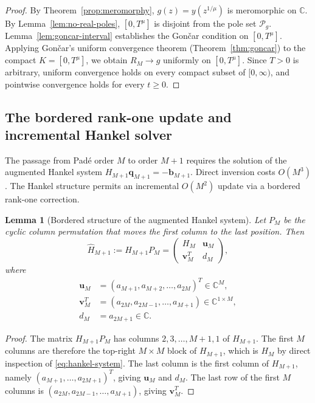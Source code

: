 \documentclass[11pt]{article}
\newtheorem{lemma}[theorem]{Lemma}
\theoremstyle{definition}
\theoremstyle{remark}
\begin{document}
\begin{proof}
By Theorem~\ref{prop:meromorphy}, $g(z)=y(z^{1/\mu})$ is meromorphic on $\mathbb{C}$. By Lemma~\ref{lem:no-real-poles}, $[0,T^{\mu}]$ is disjoint from the pole set $\mathcal{P}_{g}$. Lemma~\ref{lem:goncar-interval} establishes the Gon\v{c}ar condition on $[0,T^{\mu}]$. Applying Gon\v{c}ar's uniform convergence theorem (Theorem~\ref{thm:goncar}) to the compact $K=[0,T^{\mu}]$, we obtain $R_{M}\to g$ uniformly on $[0,T^{\mu}]$. Since $T>0$ is arbitrary, uniform convergence holds on every compact subset of $[0,\infty)$, and pointwise convergence holds for every $t\ge 0$.
\end{proof}

\subsection{The bordered rank-one update and incremental Hankel solver}
\label{sec:rank-one}

The passage from Pad\'e order $M$ to order $M+1$ requires the solution of the augmented Hankel system $H_{M+1}\bm{q}_{M+1}=-\bm{b}_{M+1}$. Direct inversion costs $O(M^{3})$. The Hankel structure permits an incremental $O(M^{2})$ update via a bordered rank-one correction.

\begin{lemma}[Bordered structure of the augmented Hankel system]
\label{lem:bordered}
Let $P_{M}$ be the cyclic column permutation that moves the first column to the last position. Then
\begin{equation}
\hat{H}_{M+1}:=H_{M+1}P_{M}=
\begin{pmatrix}
H_{M} & \mathbf{u}_{M}\\[2pt]
\mathbf{v}_{M}^{T} & d_{M}
\end{pmatrix},
\label{eq:bordered}
\end{equation}
where
\begin{align}
\mathbf{u}_{M}&=(a_{M+1},a_{M+2},\ldots,a_{2M})^{T}\in\mathbb{C}^{M},\\
\mathbf{v}_{M}^{T}&=(a_{2M},a_{2M-1},\ldots,a_{M+1})\in\mathbb{C}^{1\times M},\\
d_{M}&=a_{2M+1}\in\mathbb{C}.
\end{align}
\end{lemma}

\begin{proof}
The matrix $H_{M+1}P_{M}$ has columns $2,3,\ldots,M+1,1$ of $H_{M+1}$. The first $M$ columns are therefore the top-right $M\times M$ block of $H_{M+1}$, which is $H_{M}$ by direct inspection of \eqref{eq:hankel-system}. The last column is the first column of $H_{M+1}$, namely $(a_{M+1},\ldots,a_{2M+1})^{T}$, giving $\mathbf{u}_{M}$ and $d_{M}$. The last row of the first $M$ columns is $(a_{2M},a_{2M-1},\ldots,a_{M+1})$, giving $\mathbf{v}_{M}^{T}$.
\end{proof}
\end{document}
